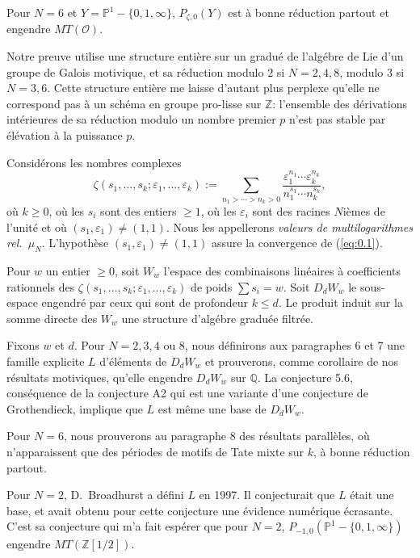 \documentclass[11pt,a4paper]{article}
\theoremstyle{plain}
\theoremstyle{definition}
\newcommand{\Q}{\mathbb{Q}}
\newcommand{\Z}{\mathbb{Z}}
\newcommand{\Pone}{\mathbb{P}^1}
\begin{document}
Pour $N=6$ et $Y = \Pone - \{0,1,\infty\}$, $P_{\zeta,0}(Y)$ est \`a bonne r\'eduction partout et engendre $MT(\mathcal{O})$.

Notre preuve utilise une structure enti\`ere sur un gradu\'e de l'alg\'ebre de Lie d'un groupe de Galois motivique, et sa r\'eduction modulo $2$ si $N=2,4,8$, modulo $3$ si $N=3,6$. Cette structure enti\`ere me laisse d'autant plus perplexe qu'elle ne correspond pas \`a un sch\'ema en groupe pro-lisse sur $\Z$: l'ensemble des d\'erivations int\'erieures de sa r\'eduction modulo un nombre premier $p$ n'est pas stable par \'el\'evation \`a la puissance $p$.

Consid\'erons les nombres complexes
\begin{equation}
\label{eq:0.1}
\zeta(s_1,\ldots,s_k; \varepsilon_1,\ldots,\varepsilon_k) := \sum_{n_1 > \cdots > n_k > 0} \frac{\varepsilon_1^{n_1} \cdots \varepsilon_k^{n_k}}{n_1^{s_1} \cdots n_k^{s_k}},
\end{equation}
o\`u $k \geq 0$, o\`u les $s_i$ sont des entiers $\geq 1$, o\`u les $\varepsilon_i$ sont des racines $N$i\`emes de l'unit\'e et o\`u $(s_1, \varepsilon_1) \neq (1,1)$. Nous les appellerons {\em valeurs de multilogarithmes rel.~$\mu_N$}. L'hypoth\`ese $(s_1,\varepsilon_1) \neq (1,1)$ assure la convergence de (\ref{eq:0.1}).

Pour $w$ un entier $\geq 0$, soit $W_w$ l'espace des combinaisons lin\'eaires \`a coefficients rationnels des $\zeta(s_1,\ldots,s_k; \varepsilon_1,\ldots,\varepsilon_k)$ de poids $\sum s_i = w$. Soit $D_d W_w$ le sous-espace engendr\'e par ceux qui sont de profondeur $k \leq d$. Le produit induit sur la somme directe des $W_w$ une structure d'alg\'ebre gradu\'ee filtr\'ee.

Fixons $w$ et $d$. Pour $N = 2,3,4$ ou $8$, nous d\'efinirons aux paragraphes 6 et 7 une famille explicite $L$ d'\'el\'ements de $D_d W_w$ et prouverons, comme corollaire de nos r\'esultats motiviques, qu'elle engendre $D_d W_w$ sur $\Q$. La conjecture 5.6, cons\'equence de la conjecture A2 qui est une variante d'une conjecture de Grothendieck, implique que $L$ est m\^eme une base de $D_d W_w$.

Pour $N=6$, nous prouverons au paragraphe 8 des r\'esultats parall\`eles, o\`u n'apparaissent que des p\'eriodes de motifs de Tate mixte sur $k$, \`a bonne r\'eduction partout.

Pour $N=2$, D.~Broadhurst a d\'efini $L$ en 1997. Il conjecturait que $L$ \'etait une base, et avait obtenu pour cette conjecture une \'evidence num\'erique \'ecrasante. C'est sa conjecture qui m'a fait esp\'erer que pour $N=2$, $P_{-1,0}(\Pone - \{0,1,\infty\})$ engendre $MT(\Z[1/2])$.
\end{document}
